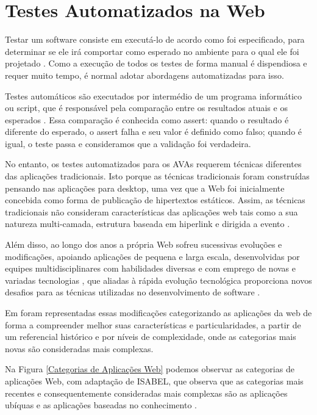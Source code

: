 \documentclass[
	12pt,				%
	openright,			%
	oneside,			%
	a4paper,			%
	chapter=TITLE,		%
	section=TITLE,		%
	subsection=TITLE,	%
	subsubsection=TITLE,%
	english,			%
	brazil				%
	]{abntex2}
\theoremstyle{definition}
\begin{document}
\pagebreak
 
\section{Testes Automatizados na Web}

Testar um software consiste em executá-lo de acordo como foi especificado, para determinar se ele irá comportar como esperado no ambiente para o qual ele foi projetado \cite{izabel2014testes}. Como a execução de todos os testes de forma manual é dispendiosa e requer muito tempo, é normal adotar abordagens automatizadas para isso.

Testes automáticos são executados por intermédio de um programa informático ou script, que é responsável pela comparação entre os resultados atuais e os esperados \cite{sharma2014quantitative}. Essa comparação é conhecida como assert: quando o resultado é diferente do esperado, o assert falha e seu valor é definido como falso; quando é igual, o teste passa e consideramos que a validação foi verdadeira.

No entanto, os testes automatizados para os AVAs requerem técnicas diferentes das aplicações tradicionais. Isto porque as técnicas tradicionais foram construídas pensando nas aplicações para desktop, uma vez que a Web foi inicialmente concebida como forma de publicação de hipertextos estáticos. Assim, as técnicas tradicionais não consideram características das aplicações web tais como a sua natureza multi-camada, estrutura baseada em hiperlink e dirigida a evento \cite{santa2011seleccao}.

Além disso, ao longo dos anos a própria Web sofreu sucessivas evoluções e modificações, apoiando aplicações de pequena e larga escala, desenvolvidas por equipes multidisciplinares com habilidades diversas e com emprego de novas e variadas tecnologias \cite{mendes2006need}, que aliadas à rápida evolução tecnológica proporciona novos desafios para as técnicas utilizadas no desenvolvimento de software \cite{santa2011seleccao}.

Em \cite{kappel2004web} foram representadas essas modificações categorizando as aplicações da web de forma a compreender melhor suas características e particularidades, a partir de um referencial histórico e por níveis de complexidade, onde as categorias mais novas são consideradas mais  complexas.

Na Figura \ref{Categorias de Aplicações Web} podemos observar as categorias de aplicações Web, com adaptação de ISABEL, que observa que as categorias mais recentes e consequentemente consideradas mais complexas são as aplicações ubíquas e as aplicações baseadas no conhecimento \cite{santa2011seleccao}.
\end{document}
